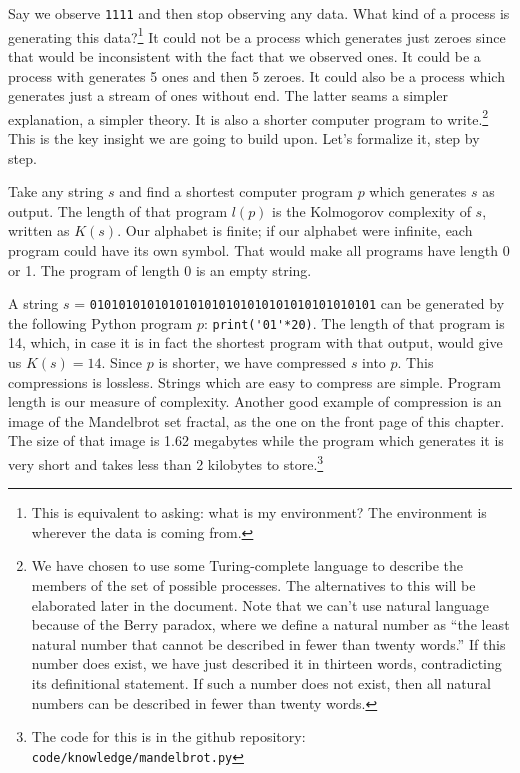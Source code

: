 Say we observe \texttt{1111} and then stop observing any data.
What kind of a process is generating this data?\footnote{This is equivalent to asking: what is my environment? The environment is wherever the data is coming from.}
It could not be a process which generates just zeroes since that would be inconsistent with the fact that we observed ones.
It could be a process with generates 5 ones and then 5 zeroes.
It could also be a process which generates just a stream of ones without end.
The latter seams a simpler explanation, a simpler theory.
It is also a shorter computer program to write.\footnote{
We have chosen to use some Turing-complete language to describe the members of the set of possible processes.
The alternatives to this will be elaborated later in the document.
Note that we can't use natural language because of the Berry paradox, where we define a natural number as “the least natural number that cannot be described in fewer than twenty words.”
If this number does exist, we have just described it in thirteen words, contradicting its definitional statement.
If such a number does not exist, then all natural numbers can be described in fewer than twenty words.
}
This is the key insight we are going to build upon.
Let's formalize it, step by step.

Take any string $s$ and find a shortest computer program $p$ which generates $s$ as output.
The length of that program $l(p)$ is the Kolmogorov complexity of $s$, written as $K(s)$.
Our alphabet is finite; if our alphabet were infinite, each program could have its own symbol.
That would make all programs have length 0 or 1.
The program of length 0 is an empty string.

A string $s$ = \texttt{0101010101010101010101010101010101010101} can be generated by the following Python program $p$: \verb|print('01'*20)|.
The length of that program is 14, which, in case it is in fact the shortest program with that output, would give us $K(s) = 14$.
Since $p$ is shorter, we have compressed $s$ into $p$.
This compressions is lossless.
Strings which are easy to compress are simple.
Program length is our measure of complexity.
Another good example of compression is an image of the Mandelbrot set fractal, as the one on the front page of this chapter.
The size of that image is 1.62 megabytes while the program which generates it is very short and takes less than 2 kilobytes to store.\footnote{The code for this is in the github repository: \texttt{code/knowledge/mandelbrot.py}}

